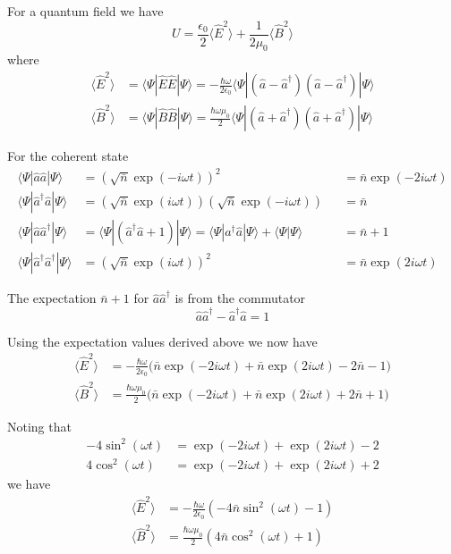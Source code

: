 For a quantum field we have
\begin{equation*}
U=\frac{\epsilon_0}{2}\langle\hat E^2\rangle+\frac{1}{2\mu_0}\langle\hat B^2\rangle
\end{equation*}
where
\begin{align*}
\langle\hat E^2\rangle
&=\langle\Psi|\hat E\hat E|\Psi\rangle
=-\frac{\hbar\omega}{2\epsilon_0}
\langle\Psi|(\hat a-\hat a^\dag)(\hat a-\hat a^\dag)|\Psi\rangle
\\
\langle\hat B^2\rangle
&=\langle\Psi|\hat B\hat B|\Psi\rangle
=\frac{\hbar\omega\mu_0}{2}
\langle\Psi|(\hat a+\hat a^\dag)(\hat a+\hat a^\dag)|\Psi\rangle
\end{align*}

For the coherent state
\begin{align*}
\langle\Psi|\hat a\hat a|\Psi\rangle&=\left(\sqrt{\bar n}\exp(-i\omega t)\right)^2
& &=\bar n\exp(-2i\omega t)
\\
\langle\Psi|\hat a^\dag\hat a|\Psi\rangle
&=\left(\sqrt{\bar n}\exp(i\omega t)\right)\left(\sqrt{\bar n}\exp(-i\omega t)\right)
& &=\bar n
\\
\langle\Psi|\hat a\hat a^\dag|\Psi\rangle&=\langle\Psi|(\hat a^\dag\hat a+1)|\Psi\rangle
=\langle\Psi|a^\dag\hat a|\Psi\rangle+\langle\Psi|\Psi\rangle
& &=\bar n+1
\\
\langle\Psi|\hat a^\dag\hat a^\dag|\Psi\rangle&=\left(\sqrt{\bar n}\exp(i\omega t)\right)^2
& &=\bar n\exp(2i\omega t)
\end{align*}

The expectation $\bar n+1$ for $\hat a\hat a^\dag$ is from the commutator
\begin{equation*}
\hat a\hat a^\dag-\hat a^\dag\hat a=1
\end{equation*}

Using the expectation values derived above we now have
\begin{align*}
\langle\hat E^2\rangle
&=-\frac{\hbar\omega}{2\epsilon_0}
\bigl(\bar n\exp(-2i\omega t)+\bar n\exp(2i\omega t)-2\bar n-1\bigr)
\\
\langle\hat B^2\rangle
&=\frac{\hbar\omega\mu_0}{2}
\bigl(\bar n\exp(-2i\omega t)+\bar n\exp(2i\omega t)+2\bar n+1\bigr)
\end{align*}

Noting that
\begin{align*}
-4\sin^2(\omega t)&=\exp(-2i\omega t)+\exp(2i\omega t)-2\\
4\cos^2(\omega t)&=\exp(-2i\omega t)+\exp(2i\omega t)+2
\end{align*}
we have
\begin{align*}
\langle\hat E^2\rangle
&=-\frac{\hbar\omega}{2\epsilon_0}\left(-4\bar n\sin^2(\omega t)-1\right)
\\
\langle\hat B^2\rangle
&=\frac{\hbar\omega\mu_0}{2}\left(4\bar n\cos^2(\omega t)+1\right)
\end{align*}

